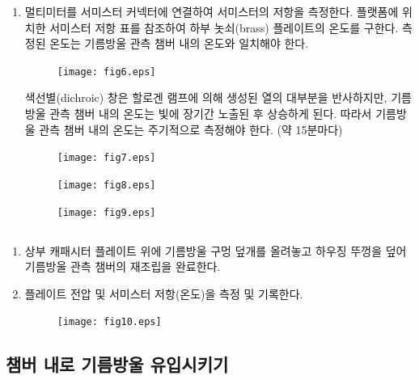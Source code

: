 \documentclass[a4paper, 10pt, nanum]{CSUniSchoolLabReport}
\begin{document}
\begin{enumerate}[label=\arabic*.]
	\item 멀티미터를 서미스터 커넥터에 연결하여 서미스터의 저항을 측정한다. 플랫폼에 위치한 서미스터 저항 표를 참조하여 하부 놋쇠(brass) 플레이트의 온도를 구한다. 측정된 온도는 기름방울 관측 챔버 내의 온도와 일치해야 한다.
	
	\begin{figure}[htb!]
		\centering
		\texttt{[image: fig6.eps]}
		\caption{}
		\label{fig:6}
	\end{figure}

	색선별(dichroic) 창은 할로겐 램프에 의해 생성된 열의 대부분을 반사하지만, 기름방울 관측 챔버 내의 온도는 빛에 장기간 노출된 후 상승하게 된다. 따라서 기름방울 관측 챔버 내의 온도는 주기적으로 측정해야 한다. (약 15분마다)

	\begin{figure}[htb!]
		\centering
		\texttt{[image: fig7.eps]}
		\caption{}
		\label{fig:7}
	\end{figure}

	\begin{figure}[htb!]
		\centering
		\texttt{[image: fig8.eps]}
		\caption{}
		\label{fig:8}
	\end{figure}

	\begin{figure}[htb!]
		\centering
		\texttt{[image: fig9.eps]}
		\caption{}
		\label{fig:9}
	\end{figure}

\end{enumerate}

\subsection{}

\begin{enumerate}[label=\arabic*.]
	\item 상부 캐패시터 플레이트 위에 기름방울 구멍 덮개를 올려놓고 하우징 뚜껑을 덮어 기름방울 관측 챔버의 재조립을 완료한다.
	\item 플레이트 전압 및 서미스터 저항(온도)을 측정 및 기록한다.
	
	\begin{figure}[htb!]
		\centering
		\texttt{[image: fig10.eps]}
		\caption{}
		\label{fig:10}
	\end{figure}

\end{enumerate}

\subsection{챔버 내로 기름방울 유입시키기}
\end{document}
